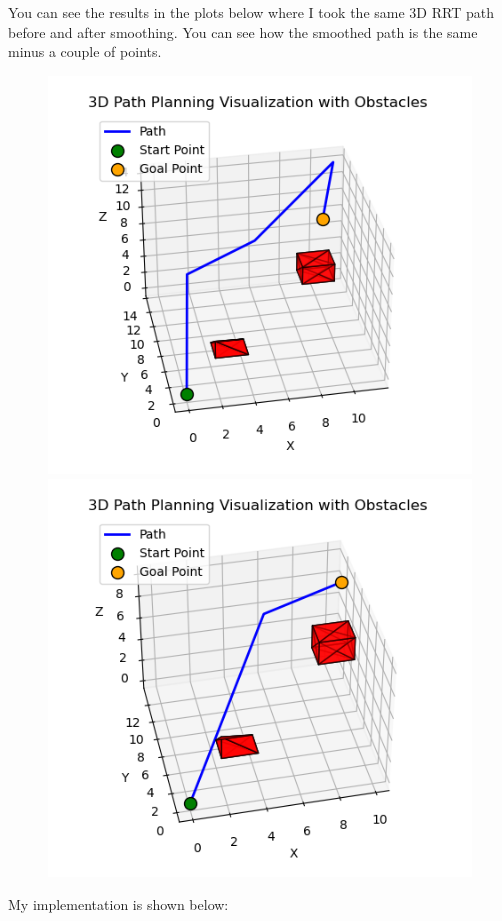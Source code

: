 \documentclass{article}
\begin{document}
You can see the results in the plots below where I took the same 3D RRT path before and after smoothing.
You can see how the smoothed path is the same minus a couple of points.

\begin{figure}[H]
    \centering
    \includegraphics[width=0.49\linewidth]{preSmoothPath.png}
    \includegraphics[width=0.49\linewidth]{postSmoothPath.png}
\end{figure}

My implementation is shown below:
\end{document}
